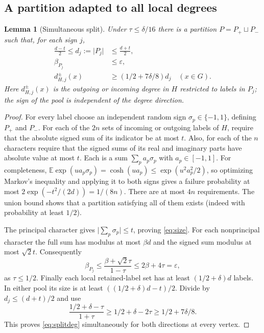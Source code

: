 \documentclass[11pt]{article}
\newtheorem{lemma}[theorem]{Lemma}
\theoremstyle{remark}\newtheorem{remark}[theorem]{Remark}
\newcommand{\abs}[1]{\lvert#1\rvert}
\newcommand{\ee}{\varepsilon}
\begin{document}
\subsection{A partition adapted to all local degrees}
\begin{lemma}[Simultaneous split]\label{lem:split}
Under $\tau\le\delta/16$ there is a partition $P=P_+\sqcup P_-$ such that, for each sign $j$,
\begin{align}
 \frac{d-t}{2}\le d_j:=\abs{P_j}&\le\frac{d+t}{2},\label{eq:size}\\
 \beta_{P_j}&\le\ee,\label{eq:poolbias}\\
 d_{H,j}^\pm(x)&\ge(1/2+7\delta/8)d_j\quad(x\in G).\label{eq:splitdeg}
\end{align}
Here $d_{H,j}^\pm(x)$ is the outgoing or incoming degree in $H$ restricted to labels in $P_j$; the sign of the pool is independent of the degree direction.
\end{lemma}
\begin{proof}
For every label choose an independent random sign $\sigma_p\in\{-1,1\}$, defining $P_+$ and $P_-$. For each of the $2n$ sets of incoming or outgoing labels of $H$, require that the absolute signed sum of its indicator be at most $t$. Also, for each of the $n$ characters require that the signed sums of its real and imaginary parts have absolute value at most $t$. Each is a sum $\sum_pa_p\sigma_p$ with $a_p\in[-1,1]$. For completeness, $\mathbb E\exp(u a_p\sigma_p)=\cosh(ua_p)\le\exp(u^2a_p^2/2)$, so optimizing Markov's inequality and applying it to both signs gives a failure probability at most $2\exp(-t^2/(2d))=1/(8n)$. There are at most $4n$ requirements. The union bound shows that a partition satisfying all of them exists (indeed with probability at least $1/2$).

The principal character gives $\abs{\sum_p\sigma_p}\le t$, proving \eqref{eq:size}. For each nonprincipal character the full sum has modulus at most $\beta d$ and the signed sum modulus at most $\sqrt2t$. Consequently
\[
 \beta_{P_j}\le\frac{\beta+\sqrt2\tau}{1-\tau}\le2\beta+4\tau=\ee,
\]
as $\tau\le1/2$. Finally each local retained-label set has at least $(1/2+\delta)d$ labels. In either pool its size is at least $((1/2+\delta)d-t)/2$. Divide by $d_j\le(d+t)/2$ and use
\[
 \frac{1/2+\delta-\tau}{1+\tau}
 \ge1/2+\delta-2\tau\ge1/2+7\delta/8.
\]
This proves \eqref{eq:splitdeg} simultaneously for both directions at every vertex.
\end{proof}
\end{document}
